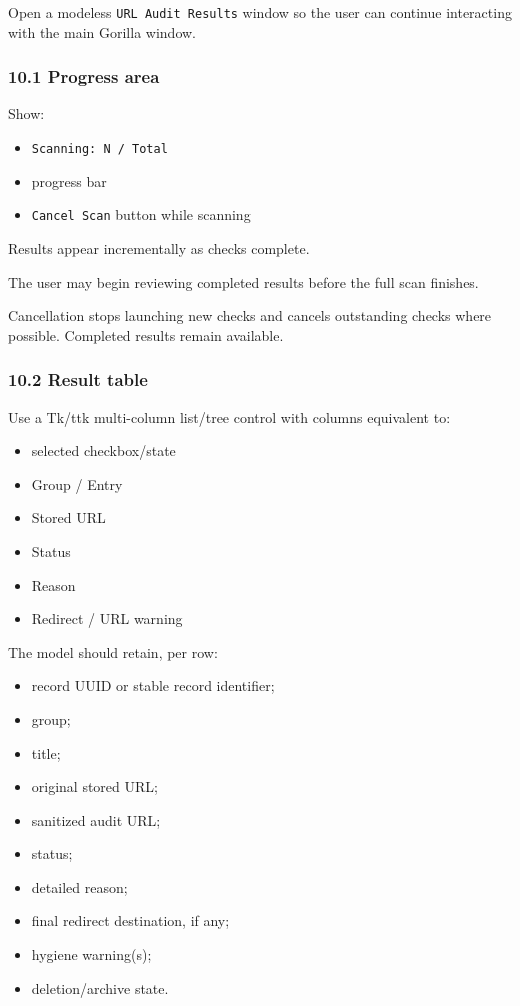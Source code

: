 \documentclass[
  letterpaper,
]{article}
\newcommand{\passthrough}[1]{#1}
\providecommand{\tightlist}{%
  \setlength{\itemsep}{0pt}\setlength{\parskip}{0pt}}
\begin{document}
Open a modeless \passthrough{\lstinline!URL Audit Results!} window so the user can continue interacting with the main
Gorilla window.

\subsubsection{10.1 Progress area}\label{101-progress-area}

Show:

\begin{itemize}
\tightlist
\item
  \passthrough{\lstinline!Scanning: N / Total!}
\item
  progress bar
\item
  \passthrough{\lstinline!Cancel Scan!} button while scanning
\end{itemize}

Results appear incrementally as checks complete.

The user may begin reviewing completed results before the full scan finishes.

Cancellation stops launching new checks and cancels outstanding checks where possible. Completed results remain
available.

\subsubsection{10.2 Result table}\label{102-result-table}

Use a Tk/ttk multi-column list/tree control with columns equivalent to:

\begin{itemize}
\tightlist
\item
  selected checkbox/state
\item
  Group / Entry
\item
  Stored URL
\item
  Status
\item
  Reason
\item
  Redirect / URL warning
\end{itemize}

The model should retain, per row:

\begin{itemize}
\tightlist
\item
  record UUID or stable record identifier;
\item
  group;
\item
  title;
\item
  original stored URL;
\item
  sanitized audit URL;
\item
  status;
\item
  detailed reason;
\item
  final redirect destination, if any;
\item
  hygiene warning(s);
\item
  deletion/archive state.
\end{itemize}
\end{document}
